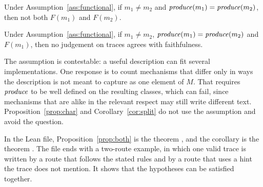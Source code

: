 \begin{proposition}
\label{prop:both}
Under Assumption~\ref{ass:functional}, if $m_1 \neq m_2$ and
$\mathit{produce}(m_1) = \mathit{produce}(m_2)$, then not both $F(m_1)$ and $F(m_2)$.
\end{proposition}

\begin{corollary}
\label{cor:functional}
Under Assumption~\ref{ass:functional}, if $m_1 \neq m_2$,
$\mathit{produce}(m_1) = \mathit{produce}(m_2)$ and $F(m_1)$, then no judgement on traces agrees with
faithfulness.
\end{corollary}

The assumption is contestable: a useful description can fit several implementations.
One response is to count mechanisms that differ only in ways the description is not
meant to capture as one element of $M$. That requires $\mathit{produce}$ to be well defined on
the resulting classes, which can fail, since mechanisms that are alike in the relevant
respect may still write different text. Proposition~\ref{prop:char} and
Corollary~\ref{cor:split} do not use the assumption and avoid the question.

In the Lean file, Proposition~\ref{prop:both} is the theorem
, and the corollary is the theorem
. The file ends with a two-route example, in
which one valid trace is written by a route that follows the stated rules and by a
route that uses a hint the trace does not mention. It shows that the hypotheses can be
satisfied together.


